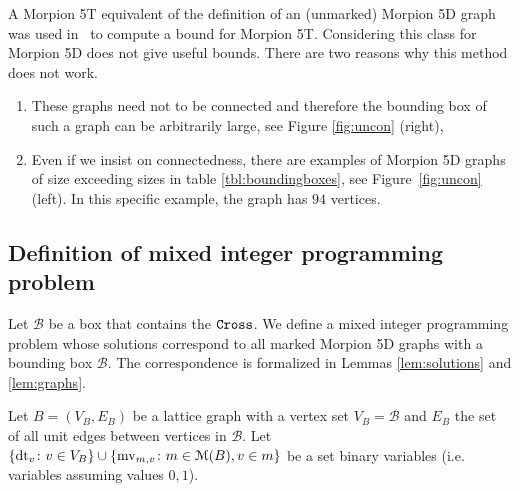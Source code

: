 \begin{remark}
%
A Morpion 5T equivalent of the definition of an (unmarked) Morpion 5D graph was 
  used in~\cite{ijcai} to compute a bound for Morpion 5T.
Considering this class for Morpion 5D  does not give useful bounds. There are two reasons why this method does not work.
\begin{enumerate}
\item These graphs need not to be connected and therefore the bounding box of such a graph
  can be arbitrarily large, see Figure \ref{fig:uncon} (right), 
\item Even if we insist on connectedness, there are examples of Morpion 5D graphs of size exceeding sizes in 
table \ref{tbl:boundingboxes}, see Figure~\ref{fig:uncon} (left). In this specific example, the graph has $94$ vertices.
\end{enumerate}
\end{remark}

\subsection{Definition of mixed integer programming problem}

Let $\mathcal{B}$ be a box that contains the $\texttt{Cross}$. 
We define a mixed integer programming problem whose solutions correspond to all marked Morpion 5D graphs with a bounding 
   box $\mathcal{B}$. The correspondence is formalized in Lemmas \ref{lem:solutions} and \ref{lem:graphs}.
  
\begin{definition}  
  \label{def:mip}
  Let $B = (V_B, E_B)$ be a lattice graph with a vertex set $V_B = \mathcal{B}$ and $E_B$ the set of all unit edges between vertices in ${\mathcal B}$. %
 Let $ \{ \operatorname{dt}_v \colon v \in V_B \} \cup \{ \operatorname{mv}_{m, v} \colon m \in \mathcal{M}(B), v \in m \}$ be a set  binary variables (i.e. variables assuming values $0, 1$).
\end{definition}
 
